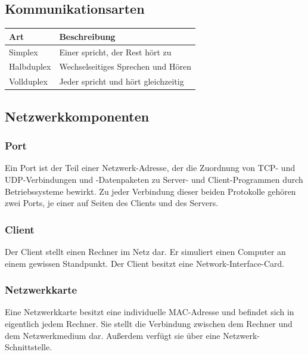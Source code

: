 \documentclass[12pt,a4paper]{article}
\begin{document}
		\subsection{Kommunikationsarten}
		\begin{table}[h]
			\renewcommand{\arraystretch}{1.5}	
			\centering
				\begin{tabularx}{17cm}{|X|X|}
					\hline
					\cellcolor{cyan!60!white}Art&\cellcolor{cyan!60!white}Beschreibung\\
					\hline
					Simplex&Einer spricht, der Rest hört zu \\
					\hline
					Halbduplex&Wechselseitiges Sprechen und Hören \\
					\hline
					Vollduplex& Jeder spricht und hört gleichzeitig \\
					\hline
				\end{tabularx}
		\end{table}
		
		\subsection{Netzwerkkomponenten}
		\subsubsection{Port}
			Ein Port ist der Teil einer Netzwerk-Adresse, der die Zuordnung von TCP- und UDP-Verbindungen und -Datenpaketen zu Server- und Client-Programmen durch Betriebssysteme bewirkt. Zu jeder Verbindung dieser beiden Protokolle gehören zwei Ports, je einer auf Seiten des Clients und des Servers.
		
		\subsubsection{Client}
			Der Client stellt einen Rechner im Netz dar. Er simuliert einen Computer an einem gewissen Standpunkt. Der Client besitzt eine Network-Interface-Card.
			\begin{center}
			\end{center}
		
		\subsubsection{Netzwerkkarte}
			Eine Netzwerkkarte besitzt eine individuelle MAC-Adresse und befindet sich in eigentlich jedem Rechner. Sie stellt die Verbindung zwischen dem Rechner und dem Netzwerkmedium dar. Außerdem verfügt sie über eine Netzwerk-Schnittstelle.
		
\end{document}
